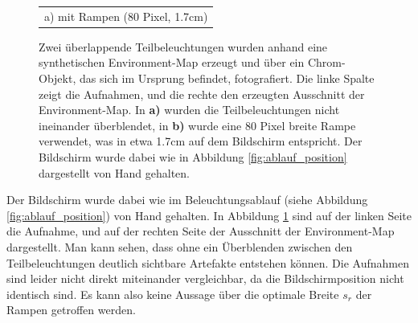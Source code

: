 \begin{figure}[h]
\begin{tabular}{cc}
      \multicolumn{2}{c}{  a) mit Rampen (80 Pixel, 1.7cm) } \\
   \end{tabular}
    \caption[Evaluation der Überlappung von Teilbeleuchtungen]{
          Zwei überlappende Teilbeleuchtungen wurden anhand eine synthetischen Environment-Map erzeugt und über ein Chrom-Objekt, das sich im Ursprung befindet, fotografiert. 
          Die linke Spalte zeigt die Aufnahmen, und die rechte den erzeugten Ausschnitt der Environment-Map.
          In \textbf{a)} wurden die Teilbeleuchtungen nicht ineinander überblendet, in \textbf{b)} wurde eine 80 Pixel breite Rampe verwendet, was in etwa 1.7cm auf dem Bildschirm entspricht.
          Der Bildschirm wurde dabei wie in Abbildung \ref{fig:ablauf_position} dargestellt von Hand gehalten. }
    \label{fig:overlap_maps}
   \end{figure}
         


      Der Bildschirm wurde dabei wie im Beleuchtungsablauf (siehe Abbildung \ref{fig:ablauf_position}) von Hand gehalten.
      In Abbildung \ref{fig:overlap_maps} sind auf der linken Seite die Aufnahme, und auf der rechten Seite der Ausschnitt der Environment-Map dargestellt.
      Man kann sehen, dass ohne ein Überblenden zwischen den Teilbeleuchtungen deutlich sichtbare Artefakte entstehen können. 
      Die Aufnahmen sind leider nicht direkt miteinander vergleichbar, da die Bildschirmposition nicht identisch sind.
      Es kann also keine Aussage über die optimale Breite $s_r$ der Rampen getroffen werden. 
 
       
